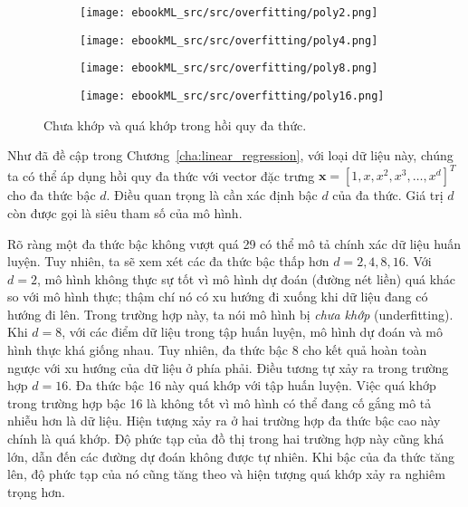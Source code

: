 \begin{figure}[t]
    \begin{subfigure}{0.49\textwidth}
    \texttt{[image: ebookML\_src/src/overfitting/poly2.png]}
    \caption{}
    \label{fig:15_polyrega}
    \end{subfigure}
    \begin{subfigure}{0.49\textwidth}
    \texttt{[image: ebookML\_src/src/overfitting/poly4.png]}
    \caption{} 
    \label{fig:15_polyregb} 
    \end{subfigure}
    \begin{subfigure}{0.49\textwidth}
    \texttt{[image: ebookML\_src/src/overfitting/poly8.png]}
    \caption{} 
    \label{fig:15_polyregc}
    \end{subfigure}
    \begin{subfigure}{0.49\textwidth}
    \texttt{[image: ebookML\_src/src/overfitting/poly16.png]}
    \caption{}
    \label{fig:15_polyregd}
    \end{subfigure}
    \caption{
      Chưa khớp và quá khớp trong hồi quy đa thức. 
    }
    \label{fig:15_polyreg}
\end{figure}
 
Như đã đề cập trong Chương~\ref{cha:linear_regression}, với loại dữ liệu này,
chúng ta có thể áp dụng hồi quy đa thức với vector đặc trưng
$\mathbf{x} = [1, x, x^2, x^3, \dots, x^d]^T$ cho đa thức bậc $d$. Điều quan
trọng là cần xác định bậc $d$ của đa thức. Giá trị $d$ còn được gọi là siêu tham số của mô hình. 
 
Rõ ràng một đa thức bậc không vượt quá 29 có thể mô tả chính xác dữ liệu huấn
luyện. Tuy nhiên, ta sẽ xem xét các đa thức bậc thấp hơn $d = 2, 4, 8, 16$. Với
$d = 2$, mô hình không thực sự tốt vì mô hình dự đoán (đường nét liền) quá khác
so với {mô hình thực}; thậm chí nó có xu hướng đi xuống khi dữ liệu đang
có hướng đi lên. Trong trường hợp này, ta nói mô hình bị \textit{chưa khớp} (underfitting).
Khi $d = 8$, với các điểm dữ liệu trong tập huấn luyện, mô hình dự đoán và mô
hình thực khá giống nhau. Tuy nhiên, đa thức bậc 8 cho kết quả hoàn toàn ngược
với {xu hướng của dữ liệu} ở phía phải. Điều tương tự xảy ra trong trường hợp $d
= 16$. Đa thức bậc 16 này quá khớp với tập huấn luyện. Việc quá khớp
trong trường hợp bậc 16 là không tốt vì mô hình có thể đang cố gắng mô tả
{nhiễu} hơn là dữ liệu. Hiện tượng xảy ra ở hai trường hợp đa thức bậc
cao này chính là quá khớp. Độ phức tạp của đồ thị trong hai
trường hợp này cũng khá lớn, dẫn đến các đường dự đoán không được tự nhiên. Khi bậc của đa thức tăng lên, độ phức tạp của nó cũng tăng theo và hiện tượng quá khớp xảy ra nghiêm trọng hơn. 
 
